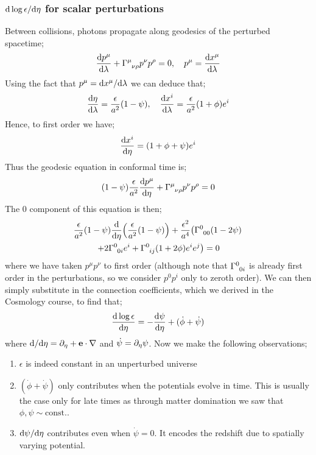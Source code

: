 \subsubsection{$\text{d} \log \epsilon/\text{d} \eta$ for scalar perturbations}
Between collisions, photons propagate along geodesics of the perturbed spacetime;
\begin{equation*}
\frac{\ud p^{\mu}}{\ud \lambda} + \Gamma\indices{^{\mu}_{\nu\rho}}p^{\nu}p^{\rho} = 0, \quad p^{\mu} = \frac{\ud x^{\mu}}{\ud \lambda}
\end{equation*}
Using the fact that $p^{\mu} = \text{d} x^{\mu}/ \text{d} \lambda$ we can deduce that;
\begin{equation*}
\frac{\text{d} \eta}{\text{d} \lambda} = \frac{\epsilon}{a^2}(1 - \psi), \quad \frac{\text{d} x^i}{\text{d} \lambda} = \frac{\epsilon}{a^2}(1 + \phi)e^{i}
\end{equation*}
Hence, to first order we have;
\begin{equation*}
\frac{\text{d} x^i}{\text{d} \eta} = (1 + \phi + \psi)e^{i}
\end{equation*}
Thus the geodesic equation in conformal time is;
\begin{equation*}
(1 - \psi)\frac{\epsilon}{a^2}\frac{\ud p^{\mu}}{\ud \eta} + \Gamma\indices{^{\mu}_{\nu \rho}}p^{\nu}p^{\rho} = 0
\end{equation*}
The $0$ component of this equation is then;
\begin{multline*}
\frac{\epsilon}{a^2}(1 - \psi)\frac{\ud}{\ud \eta}\left(\frac{\epsilon}{a^2}(1 - \psi)\right) + \frac{\epsilon^2}{a^4}\left(\Gamma\indices{^{0}_{00}}(1 - 2\psi) \right. \\ \left.+ 2\Gamma\indices{^{0}_{0i}}e^{i} + \Gamma\indices{^{0}_{ij}}(1 + 2\phi)e^{i}e^{j}\right) = 0
\end{multline*}
where we have taken $p^{\mu}p^{\nu}$ to first order (although note that $\Gamma\indices{^{0}_{0i}}$ is already first order in the perturbations, so we consider $p^{0}p^{i}$ only to zeroth order). We can then simply substitute in the connection coefficients, which we derived in the Cosmology course, to find that;
\begin{equation}
\frac{\text{d} \log \epsilon}{\text{d} \eta} = -\frac{\text{d} \psi}{\text{d} \eta} + (\dot{\phi} + \dot{\psi})
\end{equation}
where $\text{d}/\text{d} \eta = \partial_\eta + \mathbf{e}\cdot \nabla$ and $\dot{\psi} = \partial_\eta \psi$. Now we make the following observations;
\begin{enumerate}
\item $\epsilon$ is indeed constant in an unperturbed universe
\item $(\dot{\phi} + \dot{\psi})$ only contributes when the potentials evolve in time. This is usually the case only for late times as through matter domination we saw that $\phi, \psi \sim \text{const.}$.
\item $\text{d} \psi / \text{d} \eta$ contributes even when $\dot{\psi} = 0$. It encodes the redshift due to spatially varying potential.
\end{enumerate}
